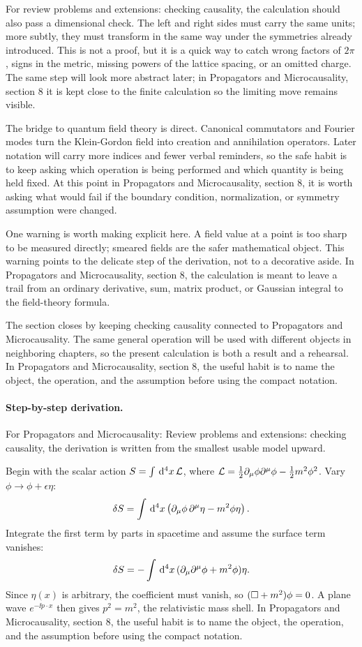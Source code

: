 For review problems and extensions: checking causality, the calculation should also pass a dimensional check.  The left and right sides must carry the same units; more subtly, they must transform in the same way under the symmetries already introduced.  This is not a proof, but it is a quick way to catch wrong factors of \(2\pi\), signs in the metric, missing powers of the lattice spacing, or an omitted charge.  The same step will look more abstract later; in Propagators and Microcausality, section 8 it is kept close to the finite calculation so the limiting move remains visible.

The bridge to quantum field theory is direct.  Canonical commutators and Fourier modes turn the Klein-Gordon field into creation and annihilation operators.  Later notation will carry more indices and fewer verbal reminders, so the safe habit is to keep asking which operation is being performed and which quantity is being held fixed.  At this point in Propagators and Microcausality, section 8, it is worth asking what would fail if the boundary condition, normalization, or symmetry assumption were changed.

One warning is worth making explicit here.  A field value at a point is too sharp to be measured directly; smeared fields are the safer mathematical object.  This warning points to the delicate step of the derivation, not to a decorative aside.  In Propagators and Microcausality, section 8, the calculation is meant to leave a trail from an ordinary derivative, sum, matrix product, or Gaussian integral to the field-theory formula.

The section closes by keeping checking causality connected to Propagators and Microcausality.  The same general operation will be used with different objects in neighboring chapters, so the present calculation is both a result and a rehearsal.  In Propagators and Microcausality, section 8, the useful habit is to name the object, the operation, and the assumption before using the compact notation.



\paragraph{Step-by-step derivation.}

For Propagators and Microcausality: Review problems and extensions: checking causality, the derivation is written from the smallest usable model upward.

Begin with the scalar action \(S=\int\,\mathrm d^4x\,\mathcal L\), where \(\mathcal L=\frac12\partial_\mu\phi\partial^\mu\phi-\frac12m^2\phi^2\).  Vary \(\phi\to\phi+\epsilon\eta\):
\[
  \delta S=\int\,\mathrm d^4x\left(\partial_\mu\phi\,\partial^\mu\eta-m^2\phi\eta\right).
\]
Integrate the first term by parts in spacetime and assume the surface term vanishes:
\[
  \delta S=-\int\,\mathrm d^4x\,(\partial_\mu\partial^\mu\phi+m^2\phi)\eta.
\]
Since \(\eta(x)\) is arbitrary, the coefficient must vanish, so \((\Box+m^2)\phi=0\).  A plane wave \(e^{-\ii p\cdot x}\) then gives \(p^2=m^2\), the relativistic mass shell.  In Propagators and Microcausality, section 8, the useful habit is to name the object, the operation, and the assumption before using the compact notation.

